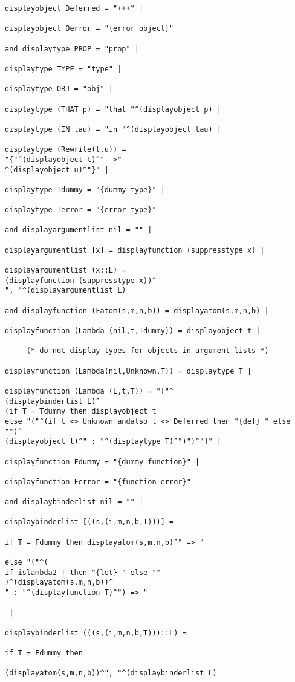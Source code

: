 \documentclass[12pt]{article}
\begin{document}
\begin{verbatim}
displayobject Deferred = "+++" |

displayobject Oerror = "{error object}"

and displaytype PROP = "prop" |

displaytype TYPE = "type" |

displaytype OBJ = "obj" |

displaytype (THAT p) = "that "^(displayobject p) |

displaytype (IN tau) = "in "^(displayobject tau) |

displaytype (Rewrite(t,u)) = 
"{"^(displayobject t)^"-->"
^(displayobject u)^"}" |

displaytype Tdummy = "{dummy type}" |

displaytype Terror = "{error type}"

and displayargumentlist nil = "" |

displayargumentlist [x] = displayfunction (suppresstype x) |

displayargumentlist (x::L) = 
(displayfunction (suppresstype x))^
", "^(displayargumentlist L) 

and displayfunction (Fatom(s,m,n,b)) = displayatom(s,m,n,b) |

displayfunction (Lambda (nil,t,Tdummy)) = displayobject t |

     (* do not display types for objects in argument lists *)
	 
displayfunction (Lambda(nil,Unknown,T)) = displaytype T |
	 
displayfunction (Lambda (L,t,T)) = "["^
(displaybinderlist L)^
(if T = Tdummy then displayobject t
else "("^(if t <> Unknown andalso t <> Deferred then "{def} " else "")^
(displayobject t)^" : "^(displaytype T)^")")^"]" |

displayfunction Fdummy = "{dummy function}" |

displayfunction Ferror = "{function error}"

and displaybinderlist nil = "" |

displaybinderlist [((s,(i,m,n,b,T)))] = 

if T = Fdummy then displayatom(s,m,n,b)^" => "

else "("^(
if islambda2 T then "{let} " else ""
)^(displayatom(s,m,n,b))^
" : "^(displayfunction T)^") => "

 |

displaybinderlist (((s,(i,m,n,b,T)))::L) = 

if T = Fdummy then

(displayatom(s,m,n,b))^", "^(displaybinderlist L)


\end{verbatim}
\end{document}
